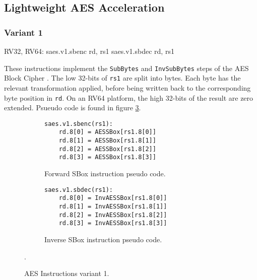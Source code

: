 
\newpage
\subsection{Lightweight AES Acceleration}




\subsubsection{Variant 1}

\begin{cryptoisa}
RV32, RV64:
    saes.v1.sbenc rd, rs1
    saes.v1.sbdec rd, rs1
\end{cryptoisa}

These instructions implement the 
{\tt SubBytes} \cite[Section 5.1.1]{nist:fips:197}
and
{\tt InvSubBytes} \cite[Section 5.3.1]{nist:fips:197}
steps of the AES Block Cipher \cite{nist:fips:197}.
The low 32-bits of {\tt rs1} are split into bytes.
Each byte has the relevant transformation applied, before
being written back to the corresponding byte position in {\tt rd}.
On an RV64 platform, the high 32-bits of the result are zero
extended.
Psueudo code is found in figure
\ref{fig:pseudo:aes:v1}.

\begin{figure}
\begin{subfigure}[b]{0.5\textwidth}
\begin{lstlisting}
saes.v1.sbenc(rs1):
    rd.8[0] = AESSBox[rs1.8[0]]
    rd.8[1] = AESSBox[rs1.8[1]]
    rd.8[2] = AESSBox[rs1.8[2]]
    rd.8[3] = AESSBox[rs1.8[3]]
\end{lstlisting}
\caption{Forward SBox instruction pseudo code.}
\label{fig:pseudo:aes:v1:sub:enc}
\end{subfigure}
\begin{subfigure}[b]{0.5\textwidth}
\begin{lstlisting}
saes.v1.sbdec(rs1):
    rd.8[0] = InvAESSBox[rs1.8[0]]
    rd.8[1] = InvAESSBox[rs1.8[1]]
    rd.8[2] = InvAESSBox[rs1.8[2]]
    rd.8[3] = InvAESSBox[rs1.8[3]]
\end{lstlisting}
\label{fig:pseudo:aes:v1:sub:dec}
\caption{Inverse SBox instruction pseudo code.}
\end{subfigure}
\caption{AES Instructions variant 1.}
\label{fig:pseudo:aes:v1}.
\end{figure}

